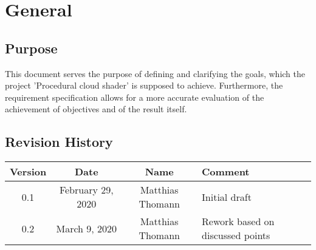 \section{General}

\subsection{Purpose}
This document serves the purpose of defining and clarifying the goals, which the project 'Procedural cloud shader' is supposed to achieve. Furthermore, the requirement specification allows for a more accurate evaluation of the achievement of objectives and of the result itself.

\subsection{Revision History}

\begin{tabularx}{\textwidth}{|c|c|c|X|}
    \hline
    \textbf{Version} & \textbf{Date} & \textbf{Name} & \textbf{Comment} \\ \hline
    0.1 & February 29, 2020 & Matthias Thomann & Initial draft \\ \hline
    0.2 & March 9, 2020 & Matthias Thomann & Rework based on discussed points \\ \hline
\end{tabularx}